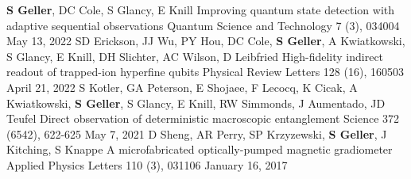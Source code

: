 

\begin{cventries}

  \cventry
  {\textbf{S Geller}, DC Cole, S Glancy, E Knill}
    {Improving quantum state detection with adaptive sequential observations}
    {Quantum Science and Technology 7 (3), 034004} %
    {May 13, 2022} %
    {}
  \cventry
  {SD Erickson, JJ Wu, PY Hou, DC Cole, \textbf{S Geller}, A Kwiatkowski, S Glancy, E Knill, DH Slichter, AC Wilson, D Leibfried}
  {High-fidelity indirect readout of trapped-ion hyperfine qubits}
  {Physical Review Letters 128 (16), 160503}
  {April 21, 2022}
  {}
  \cventry
  {S Kotler, GA Peterson, E Shojaee, F Lecocq, K Cicak, A Kwiatkowski,
    \textbf{S Geller}, S Glancy, E Knill, RW Simmonds, J Aumentado, JD Teufel}
  {Direct observation of deterministic macroscopic entanglement}
  {Science 372 (6542), 622-625}
  {May 7, 2021}
  {}
  \cventry
  {D Sheng, AR Perry, SP Krzyzewski, \textbf{S Geller}, J Kitching, S Knappe}
  {A microfabricated optically-pumped magnetic gradiometer}
  {Applied Physics Letters 110 (3), 031106}
  {January 16, 2017}
  {}

\end{cventries}
